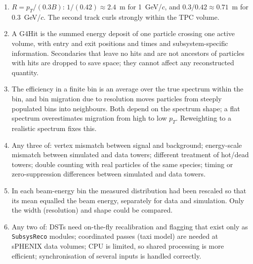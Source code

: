 \documentclass[11pt,letterpaper]{article}
\begin{document}
\begin{enumerate}[label=A\arabic*.]
A pinned \texttt{ana} build is stable for months; you update it deliberately.
\item $R=p_T/(0.3B)$: $1/(0.42)\approx2.4$~m for 1~GeV/$c$, and $0.3/0.42\approx0.71$~m for 0.3~GeV/$c$. The second track curls strongly within the TPC volume.
\item A G4Hit is the summed energy deposit of one particle crossing one active volume, with entry and exit positions and times and subsystem-specific information.
Secondaries that leave no hits and are not ancestors of particles with hits are dropped to save space; they cannot affect any reconstructed quantity.
\item The efficiency in a finite bin is an average over the true spectrum within the bin, and bin migration due to resolution moves particles from steeply populated bins into neighbours.
Both depend on the spectrum shape; a flat spectrum overestimates migration from high to low $p_T$. Reweighting to a realistic spectrum fixes this.
\item Any three of: vertex mismatch between signal and background; energy-scale mismatch between simulated and data towers; different treatment of hot/dead towers;
double counting with real particles of the same species; timing or zero-suppression differences between simulated and data towers.
\item In each beam-energy bin the measured distribution had been rescaled so that its mean equalled the beam energy, separately for data and simulation.
Only the width (resolution) and shape could be compared.
\item Any two of: DSTs need on-the-fly recalibration and flagging that exist only as \texttt{SubsysReco} modules; coordinated passes (taxi model) are needed at sPHENIX data volumes;
CPU is limited, so shared processing is more efficient; synchronisation of several inputs is handled correctly.
\end{enumerate}
\end{document}
